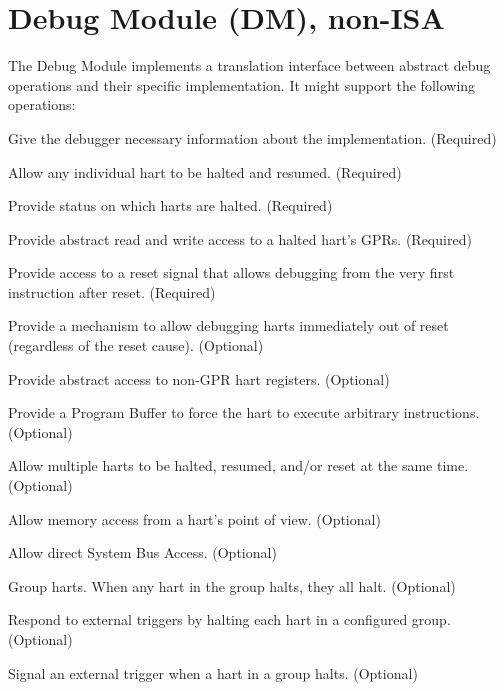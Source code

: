 \chapter{Debug Module (DM), non-ISA} \label{dm}

\begin{steps}{The Debug Module implements a translation interface between abstract debug
    operations and their specific implementation. It might support the following
    operations:}
\item Give the debugger necessary information about the implementation. (Required)
\item Allow any individual hart to be halted and resumed. (Required)
\item Provide status on which harts are halted. (Required)
\item Provide abstract read and write access to a halted hart's GPRs. (Required)
\item Provide access to a reset signal that allows debugging from the very
    first instruction after reset. (Required)
\item Provide a mechanism to allow debugging harts immediately out of reset
      (regardless of the reset cause). (Optional)
\item Provide abstract access to non-GPR hart registers. (Optional)
\item Provide a Program Buffer to force the hart to execute arbitrary instructions. (Optional)
\item Allow multiple harts to be halted, resumed, and/or reset at the same time. (Optional)
\item Allow memory access from a hart's point of view. (Optional)
\item Allow direct System Bus Access. (Optional)
\item Group harts. When any hart in the group halts, they all halt. (Optional)
\item Respond to external triggers by halting each hart in a configured group. (Optional)
\item Signal an external trigger when a hart in a group halts. (Optional)
\end{steps}

